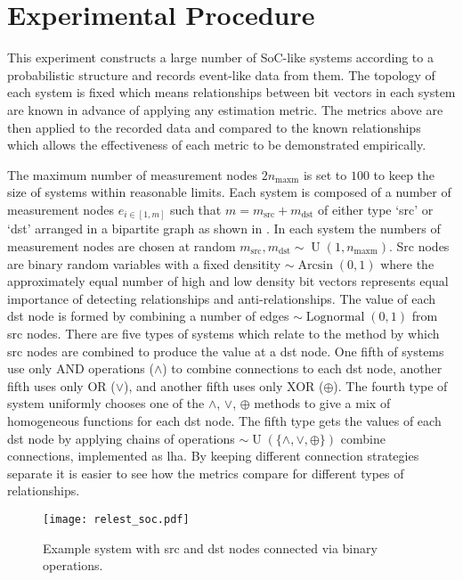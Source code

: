 \documentclass[runningheads]{llncs}
\begin{document}

\section{Experimental Procedure} %
\label{sec:experiment}

This experiment constructs a large number of \gls{SoC}-like systems according to
a probabilistic structure and records event-like data from them.
The topology of each system is fixed which means relationships between bit
vectors in each system are known in advance of applying any estimation metric.
The metrics above are then applied to the recorded data and compared to the
known relationships which allows the effectiveness of each metric to be
demonstrated empirically.

The maximum number of measurement nodes $2n_{\text{maxm}}$ is set to $100$ to
keep the size of systems within reasonable limits.
Each system is composed of a number of measurement nodes $e_{i \in [1, m]}$ such
that $m = m_{\text{src}} +  m_{\text{dst}}$ of either type `src' or `dst'
arranged in a bipartite graph as shown in .
In each system the numbers of measurement nodes are chosen at random
$m_{\text{src}}, m_{\text{dst}} \sim {\operatorname{U}}{(1, n_{\text{maxm}})}$.
Src nodes are binary random variables with a fixed densitity
$\sim {\operatorname{Arcsin}}{(0,1)}$ where the approximately equal number of
high and low density bit vectors represents equal importance of detecting
relationships and anti-relationships.
The value of each dst node is formed by combining a number of edges
$\sim {\operatorname{Lognormal}}{(0,1)}$ from src nodes.
There are five types of systems which relate to the method by which src nodes
are combined to produce the value at a dst node.
One fifth of systems use only AND operations ($\land$) to combine connections
to each dst node, another fifth uses only OR ($\lor$), and another fifth uses
only XOR ($\oplus$).
The fourth type of system uniformly chooses one of the $\land$, $\lor$, $\oplus$
methods to give a mix of homogeneous functions for each dst node.
The fifth type gets the values of each dst node by applying chains of
operations $\sim {\operatorname{U}}{( \{ \land, \lor, \oplus \} )}$ combine
connections, implemented as \gls{lha}.
By keeping different connection strategies separate it is easier to see how the
metrics compare for different types of relationships.

\begin{figure}[t] %
\centering
\texttt{[image: relest\_soc.pdf]}
\caption{Example system with src and dst nodes connected via binary operations.
\label{fig:relest_soc}}
\end{figure} %
\end{document}
